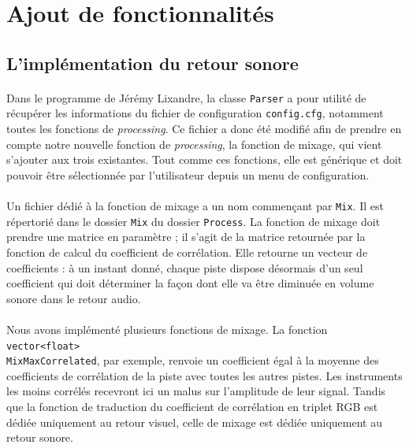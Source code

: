 \section{Ajout de fonctionnalités}

\subsection{L'implémentation du retour sonore}
\paragraph{}
Dans le programme de Jérémy Lixandre, la classe \verb!Parser! a pour
utilité de récupérer les informations du fichier de configuration
\verb!config.cfg!, notamment toutes les fonctions de
\textit{processing}. Ce fichier a donc été modifié afin de prendre en
compte notre nouvelle fonction de \textit{processing}, la fonction de
mixage, qui vient s'ajouter aux trois existantes. Tout comme ces
fonctions, elle est générique et doit pouvoir être sélectionnée par
l'utilisateur depuis un menu de configuration.

\paragraph{}
Un fichier dédié à la fonction de mixage a un nom commençant par
\verb!Mix!. Il est répertorié dans le dossier \verb!Mix! du dossier
\verb!Process!. La fonction de mixage doit prendre une matrice en
paramètre ; il s'agit de la matrice retournée par la fonction de
calcul du coefficient de corrélation. Elle retourne un vecteur de
coefficients : à un instant donné, chaque piste dispose désormais d'un
seul coefficient qui doit déterminer la façon dont elle va être
diminuée en volume sonore dans le retour audio.

\paragraph{}
Nous avons implémenté plusieurs fonctions de mixage. La fonction
\verb!vector<float>!
\\ \verb!MixMaxCorrelated!, par
exemple, renvoie un coefficient égal à la moyenne des coefficients de
corrélation de la piste avec toutes les autres pistes. Les instruments
les moins corrélés recevront ici un malus sur l'amplitude de leur signal.
Tandis que la fonction de traduction du coefficient de corrélation en
triplet RGB est dédiée uniquement au retour visuel, celle de mixage est
dédiée uniquement au retour sonore.

